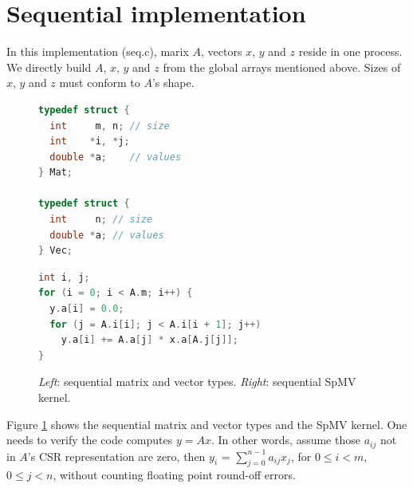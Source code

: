 \documentclass[submission]{eptcs}
\begin{document}
\section{Sequential implementation}
\label{sec:seq}
In this implementation (seq.c), marix $A$, vectors $x$, $y$ and $z$ reside in one process.
We directly build $A$, $x$, $y$ and $z$ from the global arrays mentioned above.
Sizes of $x$, $y$ and $z$ must conform to $A$'s shape.
\vspace{-10pt}
\begin{figure}[h]
\begin{minipage}{0.35\textwidth}
\begin{lstlisting}[language=C]
typedef struct {
  int     m, n; // size
  int    *i, *j;
  double *a;    // values
} Mat;

typedef struct {
  int     n; // size
  double *a; // values
} Vec;
\end{lstlisting}
\end{minipage}
\hfill
\begin{minipage}{0.55\textwidth}
  \begin{lstlisting}[language=C]
int i, j;
for (i = 0; i < A.m; i++) {
  y.a[i] = 0.0;
  for (j = A.i[i]; j < A.i[i + 1]; j++)
    y.a[i] += A.a[j] * x.a[A.j[j]];
}
\end{lstlisting}
\end{minipage}
\vspace{-10pt}
\caption{{\it Left}: sequential matrix and vector types. {\it Right}: sequential SpMV kernel.}
\label{fig:seqcsr}
\vspace{-5pt}
\end{figure}

Figure \ref{fig:seqcsr} shows the sequential matrix and vector types and the SpMV kernel.
One needs to verify the code computes $y=Ax$. In other words, assume those $a_{ij}$
not in $A$'s CSR representation are zero, then $y_i$ = $\sum_{j=0}^{n-1}a_{ij} x_j$,
for $0\leq i < m$, $0 \leq j < n$, without counting floating point round-off errors.

\end{document}
